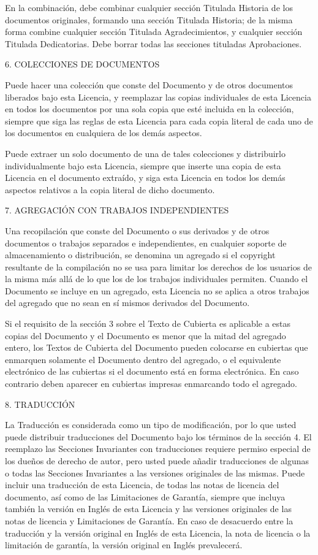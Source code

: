 \documentclass[a4paper, 11pt, oneside]{report}
\begin{document}
En la combinación, debe combinar cualquier sección Titulada Historia de los documentos originales, formando una sección Titulada Historia; de la misma forma combine cualquier sección Titulada Agradecimientos, y cualquier sección Titulada Dedicatorias. Debe borrar todas las secciones tituladas Aprobaciones.

6. COLECCIONES DE DOCUMENTOS

Puede hacer una colección que conste del Documento y de otros documentos liberados bajo esta Licencia, y reemplazar las copias individuales de esta Licencia en todos los documentos por una sola copia que esté incluida en la colección, siempre que siga las reglas de esta Licencia para cada copia literal de cada uno de los documentos en cualquiera de los demás aspectos.

Puede extraer un solo documento de una de tales colecciones y distribuirlo individualmente bajo esta Licencia, siempre que inserte una copia de esta Licencia en el documento extraído, y siga esta Licencia en todos los demás aspectos relativos a la copia literal de dicho documento.

7. AGREGACIÓN CON TRABAJOS INDEPENDIENTES

Una recopilación que conste del Documento o sus derivados y de otros documentos o trabajos separados e independientes, en cualquier soporte de almacenamiento o distribución, se denomina un agregado si el copyright resultante de la compilación no se usa para limitar los derechos de los usuarios de la misma más allá de lo que los de los trabajos individuales permiten. Cuando el Documento se incluye en un agregado, esta Licencia no se aplica a otros trabajos del agregado que no sean en sí mismos derivados del Documento.

Si el requisito de la sección 3 sobre el Texto de Cubierta es aplicable a estas copias del Documento y el Documento es menor que la mitad del agregado entero, los Textos de Cubierta del Documento pueden colocarse en cubiertas que enmarquen solamente el Documento dentro del agregado, o el equivalente electrónico de las cubiertas si el documento está en forma electrónica. En caso contrario deben aparecer en cubiertas impresas enmarcando todo el agregado.

8. TRADUCCIÓN

La Traducción es considerada como un tipo de modificación, por lo que usted puede distribuir traducciones del Documento bajo los términos de la sección 4. El reemplazo las Secciones Invariantes con traducciones requiere permiso especial de los dueños de derecho de autor, pero usted puede añadir traducciones de algunas o todas las Secciones Invariantes a las versiones originales de las mismas. Puede incluir una traducción de esta Licencia, de todas las notas de licencia del documento, así como de las Limitaciones de Garantía, siempre que incluya también la versión en Inglés de esta Licencia y las versiones originales de las notas de licencia y Limitaciones de Garantía. En caso de desacuerdo entre la traducción y la versión original en Inglés de esta Licencia, la nota de licencia o la limitación de garantía, la versión original en Inglés prevalecerá.
\end{document}
